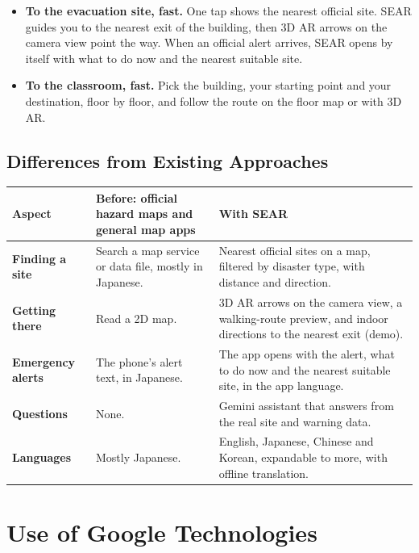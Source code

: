\documentclass[11pt,a4paper]{article}
\begin{document}
\begin{itemize}[leftmargin=1.4em,itemsep=2pt,topsep=4pt]
  \item \textbf{To the evacuation site, fast.} One tap shows the nearest official site.
        SEAR guides you to the nearest exit of the building, then 3D AR arrows on the camera
        view point the way. When an official alert arrives, SEAR opens by itself
        with what to do now and the nearest suitable site.
  \item \textbf{To the classroom, fast.} Pick the building, your starting point and your
        destination, floor by floor, and follow the route on the floor map or with 3D AR.
\end{itemize}

\subsection{Differences from Existing Approaches}

\noindent
{\setlength{\arrayrulewidth}{0.5pt}%
\begin{tabularx}{\textwidth}{|L{2.6cm}|Y|Y|}
\hline
{}
\textbf{Aspect} & \textbf{Before: official hazard maps and general map apps} & \textbf{\color{gblue!70!black}With SEAR} \\
\hline
\textbf{Finding a site}   & Search a map service or data file, mostly in Japanese. & Nearest official sites on a map, filtered by disaster type, with distance and direction. \\
\hline
\textbf{Getting there}    & Read a 2D map. & 3D AR arrows on the camera view, a walking-route preview, and indoor directions to the nearest exit (demo). \\
\hline
\textbf{Emergency alerts} & The phone's alert text, in Japanese. & The app opens with the alert, what to do now and the nearest suitable site, in the app language. \\
\hline
\textbf{Questions}        & None. & Gemini assistant that answers from the real site and warning data. \\
\hline
\textbf{Languages}        & Mostly Japanese. & English, Japanese, Chinese and Korean, expandable to more, with offline translation. \\
\hline
\end{tabularx}}

\section{Use of Google Technologies}
\end{document}
